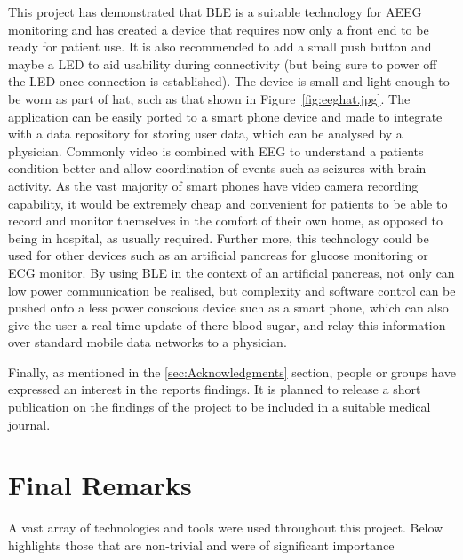 \documentclass[]{article}
\begin{document}
This project has demonstrated that \ac{BLE} is a suitable technology for \ac{AEEG} monitoring and has created a device that requires now only a front end to be ready for patient use. It is also recommended to add a small push button and maybe a LED to aid usability during connectivity (but being sure to power off the LED once connection is established). The device is small and light enough to be worn as part of hat, such as that shown in Figure~\ref{fig:eeghat.jpg}. The application can be easily ported to a smart phone device and made to integrate with a data repository for storing user data, which can be analysed by a physician. Commonly video is combined with \ac{EEG} to understand a patients condition better and allow coordination of events such as seizures with brain activity. As the vast majority of smart phones have video camera recording capability, it would be extremely cheap and convenient for patients to be able to record and monitor themselves in the comfort of their own home, as opposed to being in hospital, as usually required. Further more, this technology could be used for other devices such as an artificial pancreas for glucose monitoring or \ac{ECG} monitor. By using \ac{BLE} in the context of an artificial pancreas, not only can low power communication be realised, but complexity and software control can be pushed onto a less power conscious device such as a smart phone, which can also give the user a real time update of there blood sugar, and relay this information over standard mobile data networks to a physician. 

Finally, as mentioned in the \ref{sec:Acknowledgments} section, people or groups have expressed an interest in the reports findings. It is planned to release a short publication on the findings of the project to be included in a suitable medical journal. 


\clearpage
\section{Final Remarks}
A vast array of technologies and tools were used throughout this project. Below highlights those that are non-trivial and were of significant importance
\end{document}
